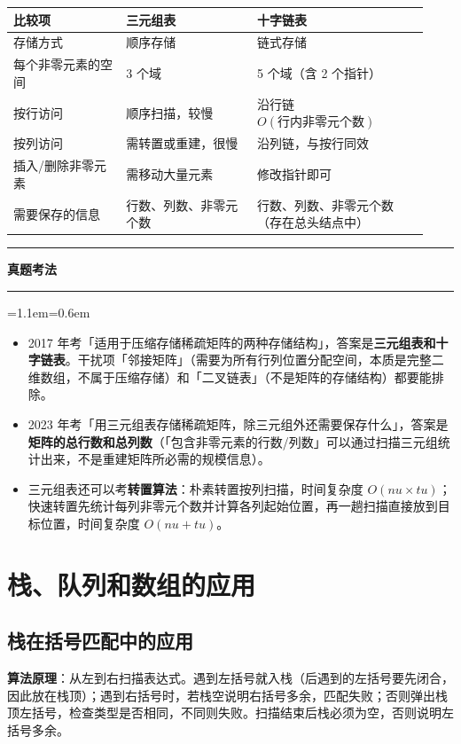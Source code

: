\documentclass[11pt,openany,UTF8]{ctexbook}
\newcommand{\callouthead}[2]{%
  \par\addvspace{7pt}\noindent
  {\color{#1}\rule[-0.15em]{3pt}{1.05em}}\hspace{0.5em}%
  {\bfseries\color{#1}#2}\par\nobreak\vspace{-0.35em}%
  {\color{rulesep}\hrule height 0.4pt}\nobreak\vspace{0.45em}%
  \begingroup\small\setlength{\parindent}{0pt}%
  \leftskip=1.1em\rightskip=0.6em\noindent\ignorespaces}
\newcommand{\calloutend}{\par\endgroup\addvspace{7pt}}
\newenvironment{callexam}[1]{\callouthead{exambar}{#1}}{\calloutend}
\begin{document}
\begingroup\small\setlength{\tabcolsep}{4.0pt}
\begin{longtable}{@{}L{0.2544\linewidth}L{0.2925\linewidth}L{0.3816\linewidth}@{}}
\toprule
\textbf{比较项} & \textbf{三元组表} & \textbf{十字链表} \\
\midrule
\endhead
存储方式 & 顺序存储 & 链式存储 \\
每个非零元素的空间 & 3 个域 & 5 个域（含 2 个指针） \\
按行访问 & 顺序扫描，较慢 & 沿行链 $O(\text{行内非零元个数})$ \\
按列访问 & 需转置或重建，很慢 & 沿列链，与按行同效 \\
插入/删除非零元素 & 需移动大量元素 & 修改指针即可 \\
需要保存的信息 & 行数、列数、非零元个数 & 行数、列数、非零元个数（存在总头结点中） \\
\bottomrule
\end{longtable}
\endgroup

\begin{callexam}{真题考法}
\begin{itemize}
\item 2017 年考「适用于压缩存储稀疏矩阵的两种存储结构」，答案是\textbf{三元组表和十字链表}。干扰项「邻接矩阵」（需要为所有行列位置分配空间，本质是完整二维数组，不属于压缩存储）和「二叉链表」（不是矩阵的存储结构）都要能排除。
\item 2023 年考「用三元组表存储稀疏矩阵，除三元组外还需要保存什么」，答案是\textbf{矩阵的总行数和总列数}（「包含非零元素的行数/列数」可以通过扫描三元组统计出来，不是重建矩阵所必需的规模信息）。
\item 三元组表还可以考\textbf{转置算法}：朴素转置按列扫描，时间复杂度 $O(nu \times tu)$；快速转置先统计每列非零元个数并计算各列起始位置，再一趟扫描直接放到目标位置，时间复杂度 $O(nu + tu)$。
\end{itemize}
\end{callexam}

\section{栈、队列和数组的应用}

\subsection{栈在括号匹配中的应用}

\textbf{算法原理}：从左到右扫描表达式。遇到左括号就入栈（后遇到的左括号要先闭合，因此放在栈顶）；遇到右括号时，若栈空说明右括号多余，匹配失败；否则弹出栈顶左括号，检查类型是否相同，不同则失败。扫描结束后栈必须为空，否则说明左括号多余。
\end{document}
